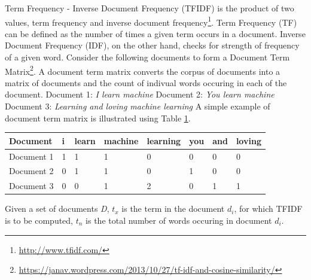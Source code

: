 \documentclass[a4paper,12pt,twoside]{report}
\begin{document}
Term Frequency - Inverse Document Frequency (\acs{TFIDF}) is the product of two values, term frequency and inverse document frequency\footnote{\url{http://www.tfidf.com/}}. Term Frequency (\acs{TF}) can be defined as the number of times a given term occurs in a document. Inverse Document Frequency (\acs{IDF}), on the other hand, checks for strength of frequency of a given word. 
\newline \newline
Consider the following documents to form a Document Term Matrix\footnote{\url{https://janav.wordpress.com/2013/10/27/tf-idf-and-cosine-similarity/}}. A document term matrix converts the corpus of documents into a matrix of documents and the count of indivual words occuring in each of the document. 
\newline 
Document 1: \textit{I learn machine} 
\newline \newline
Document 2: \textit{You learn machine} 
\newline \newline
Document 3: \textit{Learning and loving machine learning}
\newline \newline
A simple example of document term matrix is illustrated using Table \ref{tab:dtmExample}. 
\begin{table} %
    \centering
    \begin{adjustbox}{max width=\columnwidth}
    \def\arraystretch{1} %
    \begin{tabular}{p{3cm} p{2cm} p{2cm} p{2cm} p{2cm} p{2cm} p{2cm} p{2cm}}
        \toprule
        \textbf{Document} & \textbf{i} & \textbf{learn} & \textbf{machine} & \textbf{learning} & \textbf{you} & \textbf{and} & \textbf{loving}\\
        \midrule
			Document 1 & 1 & 1 & 1 & 0 & 0 & 0 & 0\\
			Document 2 & 0 & 1 & 1 & 0 & 1 & 0 & 0 \\ 
			Document 3 & 0 & 0 & 1 & 2 & 0 & 1 & 1 \\
        \midrule
    \end{tabular}
    \end{adjustbox}
    \label{tab:dtmExample}
\end{table}
Given a set of documents \textit{D}, \textit{$t_x$} is the term in the document \textit{$d_i$}, for which \acs{TFIDF} is to be computed, \textit{$t_n$} is the total number of words occuring in document \textit{$d_i$}.
\end{document}
